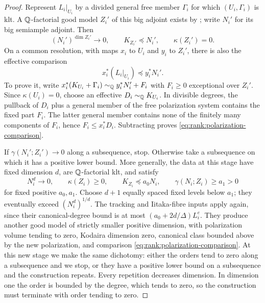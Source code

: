 \begin{proof}
Represent $L_i|_{U_i}$ by a divided general free member
$\Gamma_i$ for which $(U_i,\Gamma_i)$ is klt.  A $\mathbb Q$-factorial good
model $Z_i'$ of this big adjoint exists by \cite{BCHM2010}; write $N_i'$
for its big semiample adjoint.  Then
\[
 (N_i')^{\dim Z_i'}\longrightarrow0,
 \qquad K_{Z_i'}\preceq N_i',
 \qquad\kappa(Z_i')=0.
\]
On a common resolution, with maps $x_i$ to $U_i$ and $y_i$ to $Z_i'$,
there is also the effective comparison
\begin{equation}\label{eq:rank:polarization-comparison}
                         x_i^*(L_i|_{U_i})\preceq y_i^*N_i'.
\end{equation}
To prove it, write
$x_i^*(K_{U_i}+\Gamma_i)\sim_{\mathbb Q}y_i^*N_i'+F_i$ with $F_i\ge0$
exceptional over $Z_i'$.  Since $\kappa(U_i)=0$, choose an effective
$D_i\sim_{\mathbb Q}K_{U_i}$.  In divisible degrees, the pullback of $D_i$
plus a general member of the free polarization system contains the
fixed part $F_i$.  The latter general member contains none of the
finitely many components of $F_i$, hence $F_i\le x_i^*D_i$.  Subtracting
proves \eqref{eq:rank:polarization-comparison}.

If $\gamma(N_i';Z_i')\to0$ along a subsequence, stop.  Otherwise take
a subsequence on which it has a positive lower bound.  More generally,
the data at this stage have fixed dimension $d$, are $\mathbb Q$-factorial klt,
and satisfy
\[
 N_i^d\to0,\qquad \kappa(Z_i)\ge0,\qquad
 K_{Z_i}\preceq a_0N_i,\qquad \gamma(N_i;Z_i)\ge a_1>0
\]
for fixed positive $a_0,a_1$.  Choose $d+1$ equally spaced fixed levels
below $a_1$; they eventually exceed $(N_i^d)^{1/d}$.  The tracking and
Iitaka-fibre inputs apply again, since their canonical-degree bound is
at most $(a_0+2d/\Delta)L_i^e$.  They produce another good model of
strictly smaller positive dimension, with polarization volume tending
to zero, Kodaira dimension zero, canonical class bounded above by the
new polarization, and comparison
\eqref{eq:rank:polarization-comparison}.  At this new stage we make the
same dichotomy: either the orders tend to zero along a subsequence and
we stop, or they have a positive lower bound on a subsequence and the
construction repeats.  Every repetition decreases dimension.  In
dimension one the order is bounded by the degree, which tends to zero,
so the construction must terminate with order tending to zero.


\end{proof}
